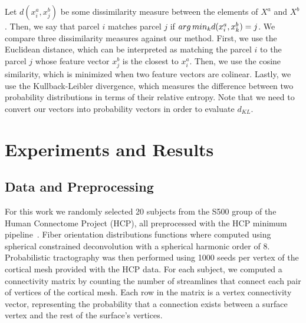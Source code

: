 Let $d(x^a_i,x^b_j)$ be some dissimilarity measure between the elements of $X^a$ and $X^b$. Then, we say that parcel $i$ matches parcel $j$ if $arg\,min_k d(x^a_i,x^b_k) = j$. We compare three dissimilarity measures against our method.
First, we use the Euclidean distance, which  can be interpreted as matching the parcel $i$ to the parcel $j$ whose feature vector $x^b_j$ is the closest to $x^a_i$.
Then, we use the cosine similarity, which is minimized when two feature vectors are colinear. 
Lastly, we use the Kullback-Leibler divergence, which measures the difference between two probability distributions in terms of their relative entropy. Note that we need to convert our vectors into probability vectors in order to evaluate $d_{KL}$. 


\section{Experiments and Results}

\subsection{Data and Preprocessing}
\label{sec:fingerprint}
For this work we randomly selected 20 subjects from the S500 group of the Human Connectome Project (HCP), all preprocessed with the HCP minimum pipeline~\cite{Glasser2013}. Fiber orientation distributions functions where computed using spherical constrained deconvolution with a spherical harmonic order of 8. Probabilistic tractography was then performed using 1000 seeds per vertex of the cortical mesh provided with the HCP data. For each subject, we computed a connectivity matrix by counting the number of streamlines that connect each pair of vertices of the cortical mesh. Each row in the matrix is a vertex connectivity vector, representing the probability that a connection exists between a surface vertex and the rest of the surface's vertices.

